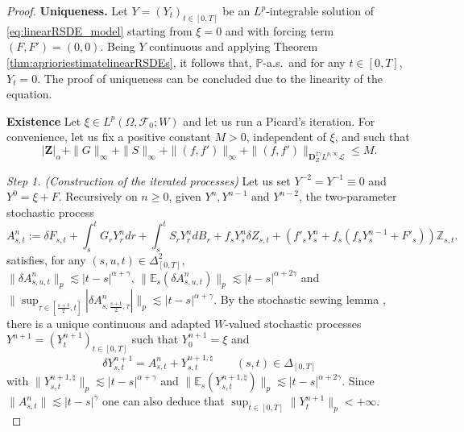 \documentclass[11pt,a4paper]{article}
\newcommand{\E}{\mathbb{E}}
\theoremstyle{plain}
\begin{document}
\begin{proof}
    \textbf{Uniqueness.} Let $Y=(Y_t)_{t \in [0,T]}$ be an $L^p$-integrable solution of \eqref{eq:linearRSDE_model} starting from $\xi=0$ and with forcing term $(F,F')=(0,0)$. Being $Y$ continuous and applying Theorem \ref{thm:aprioriestimatelinearRSDEs}, it follows that, $\mathbb{P}$-a.s.\ and for any $t \in [0,T]$, $Y_t=0$.
    The proof of uniqueness can be concluded due to the linearity of the equation.

    \textbf{Existence} Let $\xi \in L^p(\Omega,\mathcal{F}_0;W)$ and let us run a Picard's iteration. For convenience, let us fix a positive constant $M>0$, independent of $\xi$, and such that \begin{equation*}
    |\mathbf{Z}|_\alpha + \|G\|_\infty + \|S\|_\infty + \|(f,f')\|_\infty + \|(f,f')\|_{\mathbf{D}_Z^{2\gamma}L^{p,\infty}\mathscr{L}} \le M.
    \end{equation*} 

    
    \textit{Step 1. (Construction of the iterated processes)}
    Let us set $Y^{-2} = Y^{-1} \equiv 0$ and $Y^0= \xi + F$.
    Recursively on $n\ge 0$, given $Y^n, Y^{n-1}$ and $Y^{n-2}$, the two-parameter stochastic process 
    \begin{equation*}
        A^n_{s,t} := \delta F_{s,t} + \int_s^tG_rY^n_rdr + \int_s^tS_rY_r^ndB_r + f_sY_s^n\delta Z_{s,t} +(f'_sY^n_s+f_s(f_sY^{n-1}_s+F'_s))\mathbb{Z}_{s,t}.
    \end{equation*} 
    satisfies, for any $(s,u,t) \in \Delta^2_{[0,T]}$, $\|\delta A^n_{s,u,t}\|_p \lesssim|t-s|^{\alpha+\gamma}, \, \|\E_s(\delta A^n_{s,u,t})\|_p \lesssim |t-s|^{\alpha+2\gamma}$ and $\|\sup_{\tau \in [\frac{s+t}{2},t]} |\delta A^n_{s,\frac{s+t}{2},\tau}|\|_p \lesssim |t-s|^{\alpha+\gamma}$.
    By the stochastic sewing lemma \cite[Theorem 2.9]{FHL21}, there is a unique continuous and adapted $W$-valued stochastic processes $Y^{n+1}=(Y^{n+1}_t)_{t\in [0,T]}$ such that $Y^{n+1}_0 = \xi$ and  
    \begin{equation*}
        \delta Y^{n+1}_{s,t}=A_{s,t}^n + Y^{n+1,\natural}_{s,t} \qquad (s,t)\in\Delta_{[0,T]}
    \end{equation*} with $\|Y^{n+1,\natural}_{s,t}\|_{p}\lesssim |t-s|^{\alpha+\gamma}$ and $\|\E_s(Y^{n+1,\natural}_{s,t})\|_{p}\lesssim |t-s|^{\alpha+2\gamma}$. 
    Since $\|A^n_{s,t}\|\lesssim|t-s|^\gamma$ one can also deduce that $\sup_{t \in [0,T]} \|Y^{n+1}_t\|_p < +\infty$. \\ 



\end{proof}
\end{document}
